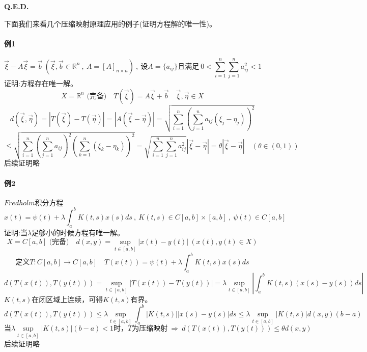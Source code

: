 \textbf{Q.E.D.}

下面我们来看几个压缩映射原理应用的例子(证明方程解的唯一性)。
\paragraph*{例1}
\[\vec{\xi}-A\vec{\xi}=\vec{b} \ (\vec{\xi},\vec{b}\in\mathbb{R}^n \ , \ A=[A]_{n \times n}) \ , \ \text{设}A=\{a_{ij}\}\text{且满足} \ 0<\sum_{i=1}^n\sum_{j=1}^na_{ij}^2<1\]
证明:方程存在唯一解。\\
\[X=\mathbb{R}^n\text{ (完备)} \quad T(\vec{\xi})=A\vec{\xi}+\vec{b} \quad \vec{\xi},\vec{\eta} \in X\]
\[d(\vec{\xi},\vec{\eta})=|T(\vec{\xi})-T(\vec{\eta})|=|A(\vec{\xi}-\vec{\eta})|=\sqrt{\sum_{i=1}^n\left(\sum_{j=1}^na_{ij}(\xi_j-\eta_j)\right)^2}\]
\[\leq \sqrt{\sum_{i=1}^n\left(\sum_{j=1}^na_{ij}\right)^2\left(\sum_{k=1}^n(\xi_k-\eta_k)\right)^2}=\sqrt{\sum_{i=1}^n\sum_{j=1}^na_{ij}^2}|\vec{\xi}-\vec{\eta}|=\theta|\vec{\xi}-\vec{\eta}| \quad (\theta \in (0,1))\]
后续证明略
\paragraph*{例2} \quad $Fredholm$积分方程
\[x(t)=\psi(t)+\lambda\int_a^bK(t,s)x(s)ds \ , \ K(t,s) \in C[a,b] \times [a,b] \ , \ \psi(t) \in C[a,b]\]
证明:当$\lambda$足够小的时候方程有唯一解。\\
\[X=C[a,b]\text{ (完备)} \quad d(x,y)=\mathop {\text{sup}}\limits_{t \in [a,b]}|x(t)-y(t)| \ (x(t),y(t) \in X)\]
\[\text{定义}T:C[a,b] \to C[a,b] \quad T(x(t))=\psi(t)+\lambda\int_a^bK(t,s)x(s)ds\]
\[d(T(x(t)),T(y(t)))=\mathop {\text{sup}}\limits_{t \in [a,b]}|T(x(t))-T(y(t))|=\lambda\mathop {\text{sup}}\limits_{t \in [a,b]}\left|\int_a^bK(t,s)(x(s)-y(s))ds\right|\]
$K(t,s)$在闭区域上连续，可得$K(t,s)$有界。
\[d(T(x(t)),T(y(t))) \leq \lambda\mathop {\text{sup}}\limits_{t \in [a,b]}\int_a^b|K(t,s)||x(s)-y(s)|ds \leq \lambda\mathop {\text{sup}}\limits_{t \in [a,b]}|K(t,s)|d(x,y)(b-a)\]
\[\text{当}\lambda\mathop {\text{sup}}\limits_{t \in [a,b]}|K(t,s)|(b-a)<1\text{时，$T$为压缩映射} \ \Rightarrow \ d(T(x(t)),T(y(t))) \leq \theta d(x,y)\]
后续证明略
